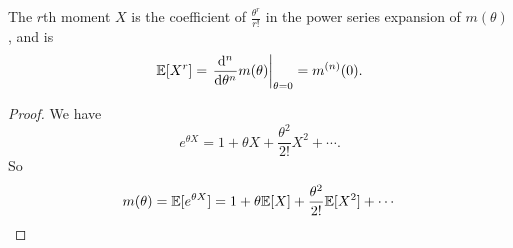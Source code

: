 %
\begin{note}
  \begin{field}
    \begin{thm}
      The $r$th moment $X$ is the coefficient of $\frac{\theta^r}{r!}$ in the power series expansion of $m(\theta)$, and is
      \[
        \mathbb{E}[X^r] = \left.\frac{\mathrm{d} ^n}{\mathrm{d} \theta^n}m(\theta)\right|_{\theta = 0} = m^{(n)}(0).
      \]
    \end{thm}
  \end{field}
  \begin{field}
    \begin{proof}
      We have
      \[
        e^{\theta X} = 1 + \theta X + \frac{\theta^2}{2!}X^2 + \cdots.
      \]
      So
      \[
        m(\theta) = \mathbb{E}[e^{\theta X}] = 1 + \theta \mathbb{E}[X] + \frac{\theta^2}{2!}\mathbb{E} [X^2] + \cdots\qedhere
      \]
    \end{proof}
  \end{field}
  \xplain{}%
\end{note}

